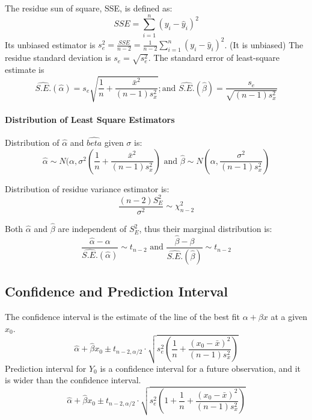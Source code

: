 \begin{definition}
	The residue sun of square, SSE, is defined as:
	\begin{equation}
		SSE=\sum^{n}_{i=1}(y_i-\hat{y}_i)^2
	\end{equation}
	Its unbiased estimator is $s^2_e = \frac{SSE}{n-2}	=\frac{1}{n-2}\sum^{n}_{i=1}(y_i-\hat{y}_i)^2$. (It is unbiased)
	The residue standard deviation is $s_e=\sqrt{s^2_e}$.
	The standard error of least-square estimate is 
	\begin{equation}
		\hat{S.E.}(\hat{\alpha})=s_e\sqrt{\frac{1}{n}+\frac{\bar{x}^2}{(n-1)s^2_x}}; \text{and } \hat{S.E.}(\hat{\beta})=\frac{s_e}{\sqrt{(n-1)s^2_x}}
	\end{equation}
\end{definition}

\paragraph{Distribution of Least Square Estimators}

Distribution of $\hat{\alpha}$ and $\hat{beta}$ given $\sigma$ is:
\begin{equation}
	\hat{\alpha} \sim N(\alpha, \sigma^2\left(\frac{1}{n}+\frac{\bar{x}^2}{(n-1)s^2_x}\right) \text{ and }
	\hat{\beta} \sim N(\alpha, \frac{\sigma^2}{(n-1)s^2_x})
\end{equation}

Distribution of residue variance estimator is:
\begin{equation}
	\frac{(n-2)S^2_E}{\sigma^2} \sim \chi^2_{n-2}
\end{equation}

Both $\hat{\alpha}$ and $\hat{\beta}$ are independent of $S^2_E$, thus their marginal distribution is:
\begin{equation}
	\frac{\hat{\alpha}-\alpha}{\hat{S.E.}(\hat{\alpha})} \sim t_{n-2} \text{ and }
	\frac{\hat{\beta}-\beta}{\hat{S.E.}(\hat{\beta})} \sim t_{n-2}
\end{equation}

\subsection{Confidence and Prediction Interval}
The confidence interval is the estimate of the line of the best fit $\alpha + \beta x$ at a given $x_0$.
\begin{equation}
	\hat{\alpha} + \hat{\beta}x_0 \pm t_{n-2, \alpha/2} \cdot \sqrt{s^2_e\left(\frac{1}{n}+\frac{(x_0-\bar{x})^2}{(n-1)s^2_x}\right)}
\end{equation}
Prediction interval for $Y_0$ is a confidence interval for a future observation, and it is wider than the confidence interval.
\begin{equation}
	\hat{\alpha} + \hat{\beta}x_0 \pm t_{n-2, \alpha/2} \cdot \sqrt{s^2_e\left(1+\frac{1}{n}+\frac{(x_0-\bar{x})^2}{(n-1)s^2_x}\right)}
\end{equation}



